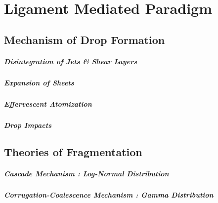\setchapterpreamble[u]{\margintoc}
\chapter{Ligament Mediated Paradigm}


\section{Mechanism of Drop Formation}

\paragraph{Disintegration of Jets \& Shear Layers}
\blindtext

\paragraph{Expansion of Sheets}
\blindtext

\paragraph{Effervescent Atomization}
\blindtext

\paragraph{Drop Impacts}
\blindtext


\section{Theories of Fragmentation}

\paragraph{Cascade Mechanism : Log-Normal Distribution}
\blindtext

\paragraph{Corrugation-Coalescence Mechanism : Gamma Distribution}
\blindtext

